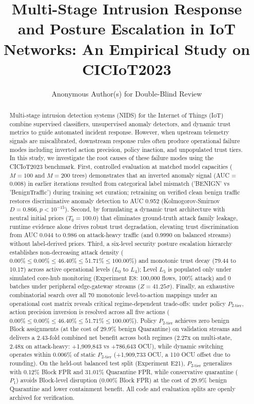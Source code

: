 \documentclass[journal,10pt,onecolumn]{IEEEtran}
\begin{document}
\title{Multi-Stage Intrusion Response and Posture Escalation in IoT Networks: An Empirical Study on CICIoT2023}

\author{Anonymous Author(s) for Double-Blind Review}

\maketitle

\begin{abstract}
Multi-stage intrusion detection systems (NIDS) for the Internet of Things (IoT) combine supervised classifiers, unsupervised anomaly detectors, and dynamic trust metrics to guide automated incident response. However, when upstream telemetry signals are miscalibrated, downstream response rules often produce operational failure modes including inverted action precision, policy inaction, and unpopulated trust tiers. In this study, we investigate the root causes of these failure modes using the CICIoT2023 benchmark. First, controlled evaluation at matched model capacities ($M=100$ and $M=200$ trees) demonstrates that an inverted anomaly signal (AUC = 0.008) in earlier iterations resulted from categorical label mismatch ('BENIGN' vs 'BenignTraffic') during training set curation; retraining on verified clean benign traffic restores discriminative anomaly detection to AUC 0.952 (Kolmogorov-Smirnov $D = 0.866, p < 10^{-15}$). Second, by formulating a dynamic trust architecture with neutral initial priors ($T_0 = 100.0$) that eliminates ground-truth attack family leakage, runtime evidence alone drives robust trust degradation, elevating trust discrimination from AUC 0.044 to 0.986 on attack-heavy traffic (and 0.9990 on balanced streams) without label-derived priors. Third, a six-level security posture escalation hierarchy establishes non-decreasing attack density ($0.00\% \le 0.00\% \le 46.40\% \le 51.71\% \le 100.00\%$) and monotonic trust decay (79.44 to 10.17) across active operational levels ($L_0$ to $L_4$); Level $L_5$ is populated only under simulated core-hub monitoring (Experiment E8: 100,000 flows, 100\% attack) and 0 batches under peripheral edge-gateway streams ($Z = 41.25\sigma$). Finally, an exhaustive combinatorial search over all 70 monotonic level-to-action mappings under an operational cost matrix reveals critical regime-dependent trade-offs: under policy $P_{2\text{-tier}}$, action precision inversion is resolved across all five actions ($0.00\% \le 0.00\% \le 46.40\% \le 51.71\% \le 100.00\%$). Policy $P_{2\text{-tier}}$ achieves zero benign Block assignments (at the cost of 29.9\% benign Quarantine) on validation streams and delivers a 2.43-fold combined net benefit across both regimes (2.27x on multi-state, 2.48x on attack-heavy: +1,909,843 vs +786,643 OCU), while dynamic switching operates within 0.006\% of static $P_{2\text{-tier}}$ (+1,909,733 OCU, a 110 OCU offset due to rounding). On the held-out balanced test split (Experiment E21), $P_{2\text{-tier}}$ generalizes with 0.12\% Block FPR and 31.01\% Quarantine FPR, while conservative quarantine ($P_1$) avoids Block-level disruption (0.00\% Block FPR) at the cost of 29.9\% benign Quarantine and lower containment benefit. All code and evaluation splits are openly archived for verification.

\end{abstract}
\end{document}
